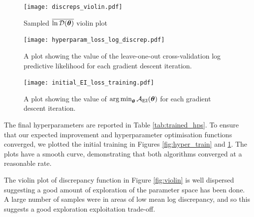 \begin{figure}[htbp]
    \centering
    \begin{minipage}[b]{0.33\textwidth}
        \centering
        \texttt{[image: discreps\_violin.pdf]}
        \caption{Sampled $\overline{\ln\mathcal{D}(\bm{\theta})}$ violin plot}
        \label{fig:violin}
    \end{minipage}
    \begin{minipage}[b]{0.66\textwidth}
        \centering
        \begin{minipage}[b]{\textwidth}
            \centering
            \texttt{[image: hyperparam\_loss\_log\_discrep.pdf]}
            \caption[{Hyperparameter optimisation validation}]{
                A plot showing the value of the leave-one-out 
                cross-validation 
                log predictive likelihood for each gradient descent
                iteration.
            }
            \label{fig:hyper_train}
        \end{minipage}
        \begin{minipage}[b]{\textwidth}
            \centering
            \texttt{[image: initial\_EI\_loss\_training.pdf]}
            \caption[{
                Acquisition function minimisation
            }]{
                A plot showing the value of $\operatorname*{arg\,min}_{\bm{\theta}}\mathcal{A}_{\mathrm{EI}}(\bm{\theta})$
                for each gradient descent iteration.
            }
            \label{fig:subEI}
        \end{minipage}
    \end{minipage}
\end{figure}

The final hyperparameters are reported in Table \ref{tab:trained_hps}.
To ensure that our expected improvement and hyperparameter optimisation 
functions converged, we plotted the initial training in 
Figures \ref{fig:hyper_train} and \ref{fig:subEI}. The plots have a 
smooth curve, demonstrating that both algorithms converged at a reasonable
rate.

The violin plot of discrepancy function in Figure \ref{fig:violin}
is well dispersed suggesting a good
amount of exploration of the parameter space has been done. A large number
of samples were in areas of low mean log discrepancy, and so 
this suggests a good exploration exploitation trade-off.

